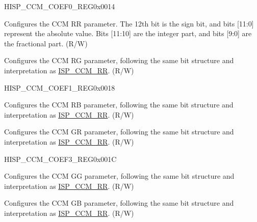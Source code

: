 \begin{register}{H}{ISP\_CCM\_COEF0\_REG}{0x0014}\label{regdesc:ISPCCMCOEF0REG}
%
%
%
\regnewline%
\begin{regdesc}\begin{reglist}
\label{fielddesc:ISPCCMRR}\item [ISP\_CCM\_RR] Configures the CCM RR parameter. The 12th bit is the sign bit, and bits [11:0] represent the absolute value. Bits [11:10] are the integer part, and bits [9:0] are the fractional part. (R/W)
\label{fielddesc:ISPCCMRG}\item [ISP\_CCM\_RG] Configures the CCM RG parameter, following the same bit structure and interpretation as \hyperref[fielddesc:ISPCCMRR]{ISP\_CCM\_RR}. (R/W)
\end{reglist}\end{regdesc}
\end{register}


\begin{register}{H}{ISP\_CCM\_COEF1\_REG}{0x0018}\label{regdesc:ISPCCMCOEF1REG}
%
%
%
\regnewline%
\begin{regdesc}\begin{reglist}
\label{fielddesc:ISPCCMRB}\item [ISP\_CCM\_RB] Configures the CCM RB parameter, following the same bit structure and interpretation as \hyperref[fielddesc:ISPCCMRR]{ISP\_CCM\_RR}. (R/W)
\label{fielddesc:ISPCCMGR}\item [ISP\_CCM\_GR] Configures the CCM GR parameter, following the same bit structure and interpretation as \hyperref[fielddesc:ISPCCMRR]{ISP\_CCM\_RR}. (R/W)
\end{reglist}\end{regdesc}
\end{register}


\begin{register}{H}{ISP\_CCM\_COEF3\_REG}{0x001C}\label{regdesc:ISPCCMCOEF3REG}
%
%
%
\regnewline%
\begin{regdesc}\begin{reglist}
\label{fielddesc:ISPCCMGG}\item [ISP\_CCM\_GG] Configures the CCM GG parameter, following the same bit structure and interpretation as \hyperref[fielddesc:ISPCCMRR]{ISP\_CCM\_RR}. (R/W)
\label{fielddesc:ISPCCMGB}\item [ISP\_CCM\_GB] Configures the CCM GB parameter, following the same bit structure and interpretation as \hyperref[fielddesc:ISPCCMRR]{ISP\_CCM\_RR}. (R/W)
\end{reglist}\end{regdesc}
\end{register}


